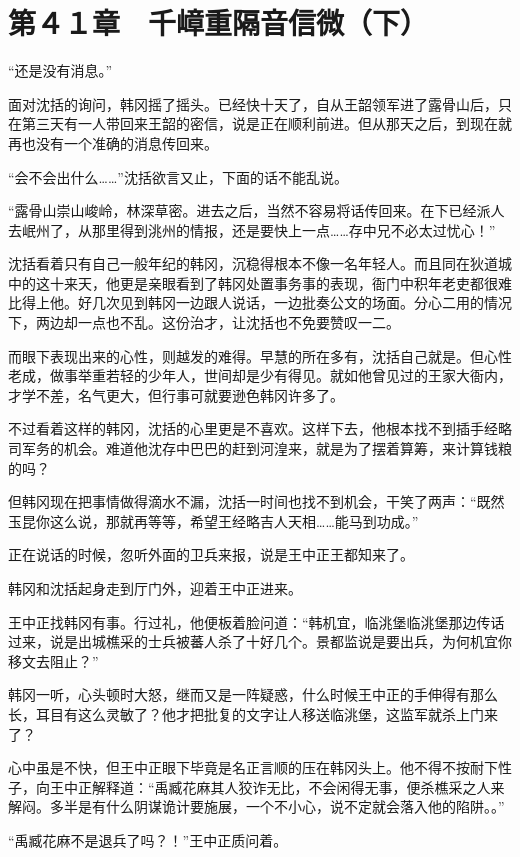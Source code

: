 \section{第４１章　千嶂重隔音信微（下）}

“还是没有消息。”

面对沈括的询问，韩冈摇了摇头。已经快十天了，自从王韶领军进了露骨山后，只在第三天有一人带回来王韶的密信，说是正在顺利前进。但从那天之后，到现在就再也没有一个准确的消息传回来。

“会不会出什么……”沈括欲言又止，下面的话不能乱说。

“露骨山崇山峻岭，林深草密。进去之后，当然不容易将话传回来。在下已经派人去岷州了，从那里得到洮州的情报，还是要快上一点……存中兄不必太过忧心！”

沈括看着只有自己一般年纪的韩冈，沉稳得根本不像一名年轻人。而且同在狄道城中的这十来天，他更是亲眼看到了韩冈处置事务事的表现，衙门中积年老吏都很难比得上他。好几次见到韩冈一边跟人说话，一边批奏公文的场面。分心二用的情况下，两边却一点也不乱。这份治才，让沈括也不免要赞叹一二。

而眼下表现出来的心性，则越发的难得。早慧的所在多有，沈括自己就是。但心性老成，做事举重若轻的少年人，世间却是少有得见。就如他曾见过的王家大衙内，才学不差，名气更大，但行事可就要逊色韩冈许多了。

不过看着这样的韩冈，沈括的心里更是不喜欢。这样下去，他根本找不到插手经略司军务的机会。难道他沈存中巴巴的赶到河湟来，就是为了摆着算筹，来计算钱粮的吗？

但韩冈现在把事情做得滴水不漏，沈括一时间也找不到机会，干笑了两声：“既然玉昆你这么说，那就再等等，希望王经略吉人天相……能马到功成。”

正在说话的时候，忽听外面的卫兵来报，说是王中正王都知来了。

韩冈和沈括起身走到厅门外，迎着王中正进来。

王中正找韩冈有事。行过礼，他便板着脸问道：“韩机宜，临洮堡临洮堡那边传话过来，说是出城樵采的士兵被蕃人杀了十好几个。景都监说是要出兵，为何机宜你移文去阻止？”

韩冈一听，心头顿时大怒，继而又是一阵疑惑，什么时候王中正的手伸得有那么长，耳目有这么灵敏了？他才把批复的文字让人移送临洮堡，这监军就杀上门来了？

心中虽是不快，但王中正眼下毕竟是名正言顺的压在韩冈头上。他不得不按耐下性子，向王中正解释道：“禹臧花麻其人狡诈无比，不会闲得无事，便杀樵采之人来解闷。多半是有什么阴谋诡计要施展，一个不小心，说不定就会落入他的陷阱。。”

“禹臧花麻不是退兵了吗？！”王中正质问着。

